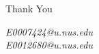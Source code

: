\documentclass{beamer}
\begin{document}
\begin{frame}
\Huge{\centerline{Thank You}}
\begin{center}
\begin{normalsize}
\emph{E0007424@u.nus.edu}\\
\emph{E0012680@u.nus.edu}
\end{normalsize}
\end{center}
\end{frame}


\end{document}
